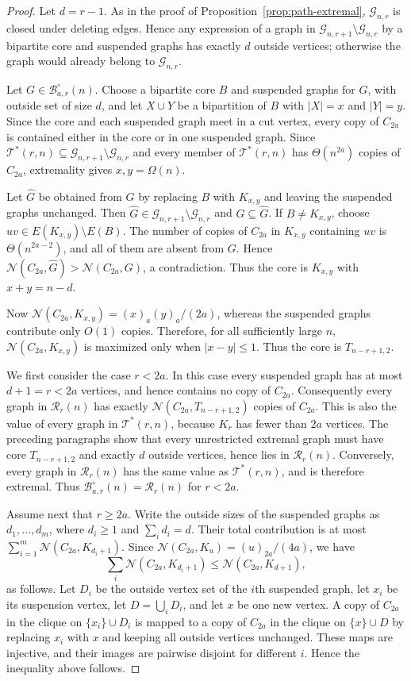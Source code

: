 \documentclass[11pt]{article}
\theoremstyle{definition}
\theoremstyle{plain}
\theoremstyle{remark}
\theoremstyle{plain}
\numberwithin{equation}{section}
\newcommand{\cG}{\mathcal G}
\newcommand{\cB}{\mathcal B}
\newcommand{\cT}{\mathcal T}
\newcommand{\cR}{\mathcal R}
\newcommand{\N}{\mathcal N}
\begin{document}
\begin{proof}
Let $d=r-1$. As in the proof of Proposition~\ref{prop:path-extremal}, $\cG_{n,r}$ is closed under deleting edges. Hence any expression of a graph in $\cG_{n,r+1}\setminus\cG_{n,r}$ by a bipartite core and suspended graphs has exactly $d$ outside vertices; otherwise the graph would already belong to $\cG_{n,r}$.

Let $G\in\cB^{\circ}_{a,r}(n)$. Choose a bipartite core $B$ and suspended graphs for $G$, with outside set of size $d$, and let $X\cup Y$ be a bipartition of $B$ with $|X|=x$ and $|Y|=y$. Since the core and each suspended graph meet in a cut vertex, every copy of $C_{2a}$ is contained either in the core or in one suspended graph. Since $\cT^*(r,n)\subseteq\cG_{n,r+1}\setminus\cG_{n,r}$ and every member of $\cT^*(r,n)$ has $\Theta(n^{2a})$ copies of $C_{2a}$, extremality gives $x,y=\Omega(n)$.

Let $\widehat G$ be obtained from $G$ by replacing $B$ with $K_{x,y}$ and leaving the suspended graphs unchanged. Then $\widehat G\in\cG_{n,r+1}\setminus\cG_{n,r}$ and $G\subseteq\widehat G$. If $B\ne K_{x,y}$, choose $uv\in E(K_{x,y})\setminus E(B)$. The number of copies of $C_{2a}$ in $K_{x,y}$ containing $uv$ is $\Theta(n^{2a-2})$, and all of them are absent from $G$. Hence $\N(C_{2a},\widehat G)>\N(C_{2a},G)$, a contradiction. Thus the core is $K_{x,y}$ with $x+y=n-d$.

Now $\N(C_{2a},K_{x,y})=(x)_a(y)_a/(2a)$, whereas the suspended graphs contribute only $O(1)$ copies. Therefore, for all sufficiently large $n$, $\N(C_{2a},K_{x,y})$ is maximized only when $|x-y|\le1$. Thus the core is $T_{n-r+1,2}$.

We first consider the case $r<2a$. In this case every suspended graph has at most $d+1=r<2a$ vertices, and hence contains no copy of $C_{2a}$. Consequently every graph in $\cR_r(n)$ has exactly $\N(C_{2a},T_{n-r+1,2})$ copies of $C_{2a}$. This is also the value of every graph in $\cT^*(r,n)$, because $K_r$ has fewer than $2a$ vertices. The preceding paragraphs show that every unrestricted extremal graph must have core $T_{n-r+1,2}$ and exactly $d$ outside vertices, hence lies in $\cR_r(n)$. Conversely, every graph in $\cR_r(n)$ has the same value as $\cT^*(r,n)$, and is therefore extremal. Thus $\cB^{\circ}_{a,r}(n)=\cR_r(n)$ for $r<2a$.

Assume next that $r\ge2a$. Write the outside sizes of the suspended graphs as $d_1,\ldots,d_m$, where $d_i\ge1$ and $\sum_i d_i=d$. Their total contribution is at most $\sum_{i=1}^m \N(C_{2a},K_{d_i+1})$. Since $\N(C_{2a},K_u)=(u)_{2a}/(4a)$, we have
\[
        \sum_i \N(C_{2a},K_{d_i+1})\le \N(C_{2a},K_{d+1}),
\]
as follows. Let $D_i$ be the outside vertex set of the $i$th suspended graph, let $x_i$ be its suspension vertex, let $D=\bigcup_iD_i$, and let $x$ be one new vertex. A copy of $C_{2a}$ in the clique on $\{x_i\}\cup D_i$ is mapped to a copy of $C_{2a}$ in the clique on $\{x\}\cup D$ by replacing $x_i$ with $x$ and keeping all outside vertices unchanged. These maps are injective, and their images are pairwise disjoint for different $i$. Hence the inequality above follows.


\end{proof}
\end{document}
